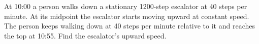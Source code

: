 At 10:00 a person walks down a stationary 1200-step escalator at 40 steps per minute. At its midpoint the escalator starts moving upward at constant speed. The person keeps walking down at 40 steps per minute relative to it and reaches the top at 10:55. Find the escalator's upward speed.

